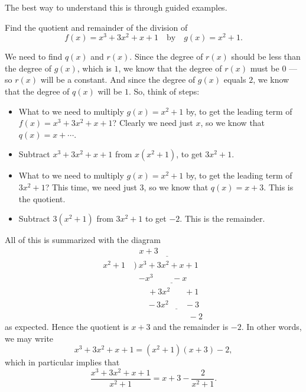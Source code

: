 \documentclass{ximera}
\begin{document}
The best way to understand this is through guided examples.

\begin{example}
  Find the quotient and remainder of the division of \[f(x) = x^3+3x^2+x+1\quad\mbox{by}\quad g(x) = x^2+1.\]
  
  \begin{explanation}
    We need to find $q(x)$ and $r(x)$. Since the degree of $r(x)$ should be less than the degree of $g(x)$, which is $1$, we know that the degree of $r(x)$ must be $0$ --- so $r(x)$ will be a constant. And since the degree of $g(x)$ equals $2$, we know that the degree of $q(x)$ will be $1$. So, think of steps:
    \begin{itemize}
    \item What to we need to multiply $g(x) = x^2+1$ by, to get the leading term of $f(x) = x^3+3x^2+x+1$? Clearly we need just $x$, so we know that $q(x) = x + \cdots$.
    \item Subtract $x^3+3x^2+x+1$ from $x(x^2+1)$, to get $3x^2+1$.
    \item What to we need to multiply $g(x) = x^2+1$ by, to get the leading term of $3x^2+1$? This time, we need just $3$, so we know that $q(x) = x + 3$. This is the quotient.
    \item Subtract $3(x^2+1)$ from $3x^2+1$ to get $-2$. This is the remainder. 
    \end{itemize}
All of this is summarized with the diagram \begin{align*}
   & \underline{~~~x+3\phantom{somethings}} \\[-4pt]  x^2+1~&\Big)~ x^3+3x^2+x+1 \\[-4pt] &\phantom{\big)~} \underline{-x^3\phantom{+3x^2}\!-x\phantom{+1...}} \\[-4pt] &\phantom{\Big)~}\phantom{0n\!}+3x^2\phantom{+0~}~+1 \\[-4pt] &\phantom{\big)~} \phantom{nn}\underline{-\,3x^2\phantom{+xn}-3\phantom{n}} \\ &\phantom{nnnnnnnnnnn}-2
\end{align*}
as expected. Hence the quotient is $x+3$ and the remainder is $-2$. In other words, we may write \[   x^3+3x^2+x+1 =(x^2+1)(x+3) - 2, \]which in particular implies that \[  \frac{x^3+3x^2+x+1}{x^2+1} = x+3 - \frac{2}{x^2+1}.  \]
  \end{explanation}
\end{example}
\end{document}
